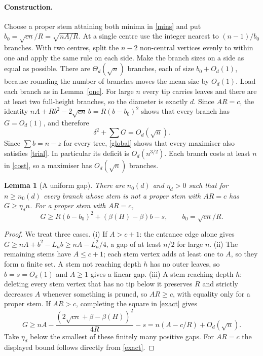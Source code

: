 \documentclass[11pt,a4paper]{article}
\newtheorem{lemma}[theorem]{Lemma}
\theoremstyle{remark}
\begin{document}
\paragraph{Construction.} Choose a proper stem attaining both minima in \eqref{mins} and put $b_0=\sqrt{cn}/R=\sqrt{nA/R}$. At a single centre use the integer nearest to $(n-1)/b_0$ branches. With two centres, split the $n-2$ non-central vertices evenly to within one and apply the same rule on each side. Make the branch sizes on a side as equal as possible. There are $\Theta_d(\sqrt n)$ branches, each of size $b_0+O_d(1)$, because rounding the number of branches moves the mean size by $O_d(1)$. Load each branch as in Lemma~\ref{one}. For large $n$ every tip carries leaves and there are at least two full-height branches, so the diameter is exactly $d$. Since $AR=c$, the identity $nA+Rb^2-2\sqrt{cn}\,b=R(b-b_0)^2$ shows that every branch has $G=O_d(1)$, and therefore
\begin{equation}
 \delta^2+\sum G=O_d(\sqrt n). \label{trial}
\end{equation}
Since $\sum b=n-z$ for every tree, \eqref{global} shows that every maximiser also satisfies \eqref{trial}. In particular its deficit is $O_d(n^{3/2})$. Each branch costs at least $n$ in \eqref{cost}, so a maximiser has $O_d(\sqrt n)$ branches.

\begin{lemma}[A uniform gap]\label{gap}
There are $n_0(d)$ and $\eta_d>0$ such that for $n\ge n_0(d)$ every branch whose stem is not a proper stem with $AR=c$ has $G\ge\eta_dn$. For a proper stem with $AR=c$,
\[
 G\ge R(b-b_0)^2+(\beta(H)-\beta)b-s,\qquad b_0=\sqrt{cn}/R .
\]
\end{lemma}
\begin{proof}
We treat three cases. (i) If $A>c+1$: the entrance edge alone gives $G\ge nA+b^2-L_nb\ge nA-L_n^2/4$, a gap of at least $n/2$ for large $n$. (ii) The remaining stems have $A\le c+1$; each stem vertex adds at least one to $A$, so they form a finite set. A stem not reaching depth $h$ has no outer leaves, so $b=s=O_d(1)$ and $A\ge1$ gives a linear gap. (iii) A stem reaching depth $h$: deleting every stem vertex that has no tip below it preserves $R$ and strictly decreases $A$ whenever something is pruned, so $AR\ge c$, with equality only for a proper stem. If $AR>c$, completing the square in \eqref{exact} gives
\[
 G\ge nA-\frac{(2\sqrt{cn}+\beta-\beta(H))^2}{4R}-s=n(A-c/R)+O_d(\sqrt n).
\]
Take $\eta_d$ below the smallest of these finitely many positive gaps. For $AR=c$ the displayed bound follows directly from \eqref{exact}.
\end{proof}
\end{document}
